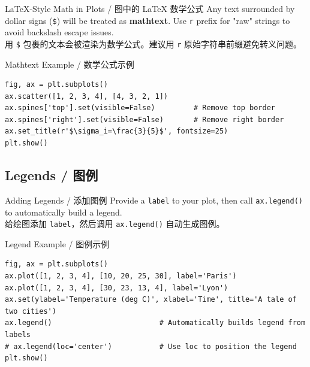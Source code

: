 \documentclass[11pt,a4paper]{article}
\begin{document}
\begin{concept}{LaTeX-Style Math in Plots / 图中的 LaTeX 数学公式}
    Any text surrounded by dollar signs (\texttt{\$}) will be treated as \textbf{mathtext}. Use \texttt{r} prefix for "raw" strings to avoid backslash escape issues. \\
    用 \texttt{\$} 包裹的文本会被渲染为数学公式。建议用 \texttt{r} 原始字符串前缀避免转义问题。
\end{concept}

\begin{examplebox}{Mathtext Example / 数学公式示例}
\begin{lstlisting}
fig, ax = plt.subplots()
ax.scatter([1, 2, 3, 4], [4, 3, 2, 1])
ax.spines['top'].set(visible=False)         # Remove top border
ax.spines['right'].set(visible=False)       # Remove right border
ax.set_title(r'$\sigma_i=\frac{3}{5}$', fontsize=25)
plt.show()
\end{lstlisting}
\end{examplebox}

\subsection{Legends / 图例}

\begin{concept}{Adding Legends / 添加图例}
    Provide a \texttt{label} to your plot, then call \texttt{ax.legend()} to automatically build a legend. \\
    给绘图添加 \texttt{label}，然后调用 \texttt{ax.legend()} 自动生成图例。
\end{concept}

\begin{examplebox}{Legend Example / 图例示例}
\begin{lstlisting}
fig, ax = plt.subplots()
ax.plot([1, 2, 3, 4], [10, 20, 25, 30], label='Paris')
ax.plot([1, 2, 3, 4], [30, 23, 13, 4], label='Lyon')
ax.set(ylabel='Temperature (deg C)', xlabel='Time', title='A tale of two cities')
ax.legend()                         # Automatically builds legend from labels
# ax.legend(loc='center')           # Use loc to position the legend
plt.show()
\end{lstlisting}
\end{examplebox}
\end{document}
